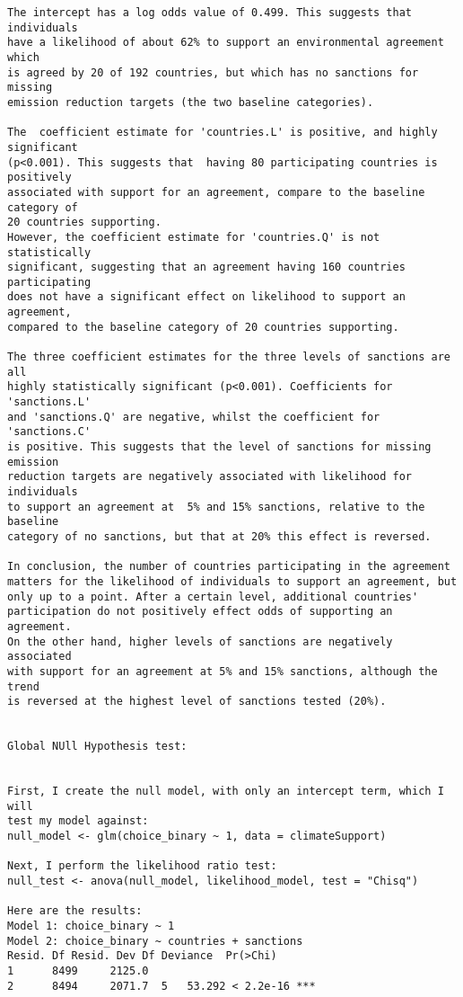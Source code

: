 \documentclass[12pt,letterpaper]{article}
\begin{document}
\begin{enumerate}
\begin{verbatim}
The intercept has a log odds value of 0.499. This suggests that individuals
have a likelihood of about 62% to support an environmental agreement which
is agreed by 20 of 192 countries, but which has no sanctions for missing
emission reduction targets (the two baseline categories).

The  coefficient estimate for 'countries.L' is positive, and highly significant
(p<0.001). This suggests that  having 80 participating countries is positively
associated with support for an agreement, compare to the baseline category of
20 countries supporting.
However, the coefficient estimate for 'countries.Q' is not statistically
significant, suggesting that an agreement having 160 countries participating
does not have a significant effect on likelihood to support an agreement,
compared to the baseline category of 20 countries supporting.

The three coefficient estimates for the three levels of sanctions are all
highly statistically significant (p<0.001). Coefficients for 'sanctions.L'
and 'sanctions.Q' are negative, whilst the coefficient for 'sanctions.C'
is positive. This suggests that the level of sanctions for missing emission
reduction targets are negatively associated with likelihood for individuals
to support an agreement at  5% and 15% sanctions, relative to the baseline
category of no sanctions, but that at 20% this effect is reversed.

In conclusion, the number of countries participating in the agreement
matters for the likelihood of individuals to support an agreement, but
only up to a point. After a certain level, additional countries'
participation do not positively effect odds of supporting an agreement.
On the other hand, higher levels of sanctions are negatively associated
with support for an agreement at 5% and 15% sanctions, although the trend
is reversed at the highest level of sanctions tested (20%).


Global NUll Hypothesis test:


First, I create the null model, with only an intercept term, which I will
test my model against:
null_model <- glm(choice_binary ~ 1, data = climateSupport)

Next, I perform the likelihood ratio test:
null_test <- anova(null_model, likelihood_model, test = "Chisq")

Here are the results:
Model 1: choice_binary ~ 1
Model 2: choice_binary ~ countries + sanctions
Resid. Df Resid. Dev Df Deviance  Pr(>Chi)    
1      8499     2125.0                          
2      8494     2071.7  5   53.292 < 2.2e-16 ***


\end{verbatim}
\end{enumerate}
\end{document}
